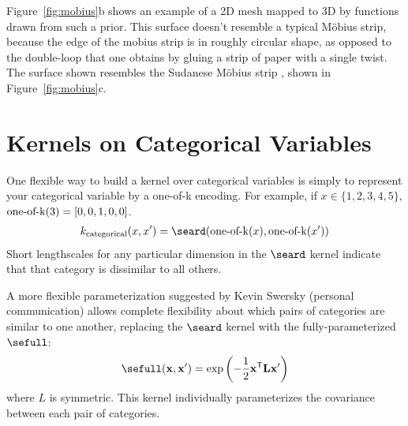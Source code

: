 %
Figure~\ref{fig:mobius}b shows an example of a 2D mesh mapped to 3D by functions drawn from such a prior.
This surface doesn't resemble a typical M\"{o}bius strip, because the edge of the mobius strip is in roughly circular shape, as opposed to the double-loop that one obtains by gluing a strip of paper with a single twist.
The surface shown resembles the Sudanese M\"{o}bius strip \citep{sudanese1984}, shown in Figure~\ref{fig:mobius}c.




\section{Kernels on Categorical Variables}



One flexible way to build a kernel over categorical variables is simply to represent your categorical variable by a one-of-k encoding.
For example, if $x \in \{ 1, 2, 3, 4, 5 \}$, $\operatorname{one-of-k}(3) = [0, 0, 1, 0, 0]$.
%
\begin{align}
k_{\textnormal{categorical}}( x, x') = \seard( \oneofk(x), \oneofk(x') )
\end{align}
%
Short lengthscales for any particular dimension in the $\seard$ kernel indicate that that category is dissimilar to all others.

A more flexible parameterization suggested by Kevin Swersky (personal communication) allows complete flexibility about which pairs of categories are similar to one another, replacing the $\seard$ kernel with the fully-parameterized $\sefull$:
%
\begin{align}
\sefull( \vx, \vx') = \exp \left( -\frac{1}{2} \vx\tra \vL \vx' \right)
\end{align}
%
where $L$ is symmetric.  This kernel individually parameterizes the covariance between each pair of categories.

